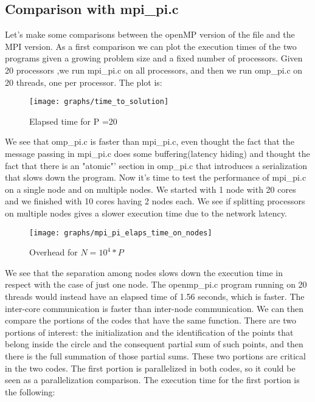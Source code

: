 \documentclass{article}
\begin{document}
\subsection{Comparison with mpi\_pi.c}
Let's make some comparisons between the openMP version of the file and the MPI version.
As a first comparison we can plot the execution times of the two programs given a growing problem size and a fixed number of processors. Given 20 processors ,we run mpi\_pi.c on all processors, and then we run omp\_pi.c on 20 threads, one per processor. The plot is:

\begin{figure}[H] %
	\centering
	\texttt{[image: graphs/time\_to\_solution]} %
	\caption{Elapsed time for P =20}
\end{figure}
We see that omp\_pi.c is faster than mpi\_pi.c, even thought the fact that the message passing in mpi\_pi.c does some buffering(latency hiding) and thought the fact that there is an "atomic"' section in omp\_pi.c that introduces a serialization that slows down the program.
Now it's time to test the performance of mpi\_pi.c on a single node and on multiple nodes. We started with 1 node with 20 cores and we finished with 10 cores having 2 nodes each. We see if splitting processors on multiple nodes gives a slower execution time due to the network latency.

\begin{figure}[H] %
	\centering
	\texttt{[image: graphs/mpi\_pi\_elaps\_time\_on\_nodes]} %
	\caption{Overhead for $N=10^4*P$}
\end{figure}

We see that the separation among nodes slows down the execution time in respect with the case of just one node. The openmp\_pi.c program running on 20 threads would instead have an elapsed time of 1.56 seconds, which is faster. The inter-core communication is faster than inter-node communication.
We can then compare the portions of the codes that have the same function.
There are two portions of interest: the initialization and the identification of the points that belong inside the circle and the consequent partial sum of such points, and then there is the full summation of those partial sums. These two portions are critical in the two codes.
The first portion is parallelized in both codes, so it could be seen as a parallelization comparison.
The execution time for the first portion is the following:
\end{document}
